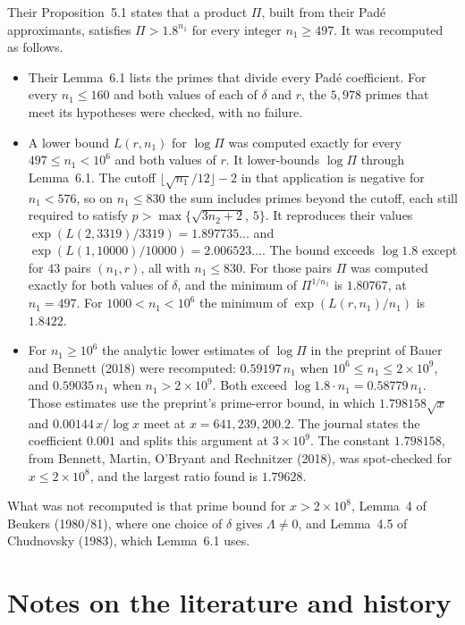 \documentclass[11pt]{article}
\begin{document}
Their Proposition~5.1 states that a product $\Pi$, built from their Pad\'e approximants, satisfies $\Pi > 1.8^{n_1}$ for every integer $n_1 \ge 497$.
It was recomputed as follows.
\begin{itemize}
\item Their Lemma~6.1 lists the primes that divide every Pad\'e coefficient.
For every $n_1 \le 160$ and both values of each of $\delta$ and $r$, the $5{,}978$ primes that meet its hypotheses were checked, with no failure.
\item A lower bound $L(r, n_1)$ for $\log \Pi$ was computed exactly for every $497 \le n_1 < 10^6$ and both values of $r$.
It lower-bounds $\log \Pi$ through Lemma~6.1.
The cutoff $\lfloor \sqrt{n_1}/12 \rfloor - 2$ in that application is negative for $n_1 < 576$, so on $n_1 \le 830$ the sum includes primes beyond the cutoff, each still required to satisfy $p > \max\bigl\{\sqrt{3n_2+2},\, 5\bigr\}$.
It reproduces their values $\exp(L(2, 3319)/3319) = 1.897735\ldots$ and $\exp(L(1, 10000)/10000) = 2.006523\ldots$.
The bound exceeds $\log 1.8$ except for $43$ pairs $(n_1, r)$, all with $n_1 \le 830$.
For those pairs $\Pi$ was computed exactly for both values of $\delta$, and the minimum of $\Pi^{1/n_1}$ is $1.80767$, at $n_1 = 497$.
For $1000 < n_1 < 10^6$ the minimum of $\exp(L(r, n_1)/n_1)$ is $1.8422$.
\item For $n_1 \ge 10^6$ the analytic lower estimates of $\log \Pi$ in the preprint of Bauer and Bennett (2018) were recomputed: $0.59197\, n_1$ when $10^6 \le n_1 \le 2 \times 10^9$, and $0.59035\, n_1$ when $n_1 > 2 \times 10^9$.
Both exceed $\log 1.8 \cdot n_1 = 0.58779\, n_1$.
Those estimates use the preprint's prime-error bound, in which $1.798158\sqrt{x}$ and $0.00144\, x/\log x$ meet at $x = 641{,}239{,}200.2$.
The journal states the coefficient $0.001$ and splits this argument at $3 \times 10^9$.
The constant $1.798158$, from Bennett, Martin, O'Bryant and Rechnitzer (2018), was spot-checked for $x \le 2 \times 10^8$, and the largest ratio found is $1.79628$.
\end{itemize}
What was not recomputed is that prime bound for $x > 2 \times 10^8$, Lemma~4 of Beukers (1980/81), where one choice of $\delta$ gives $\Lambda \ne 0$, and Lemma~4.5 of Chudnovsky (1983), which Lemma~6.1 uses.

\section{Notes on the literature and history}
\label{app:history}
\end{document}
